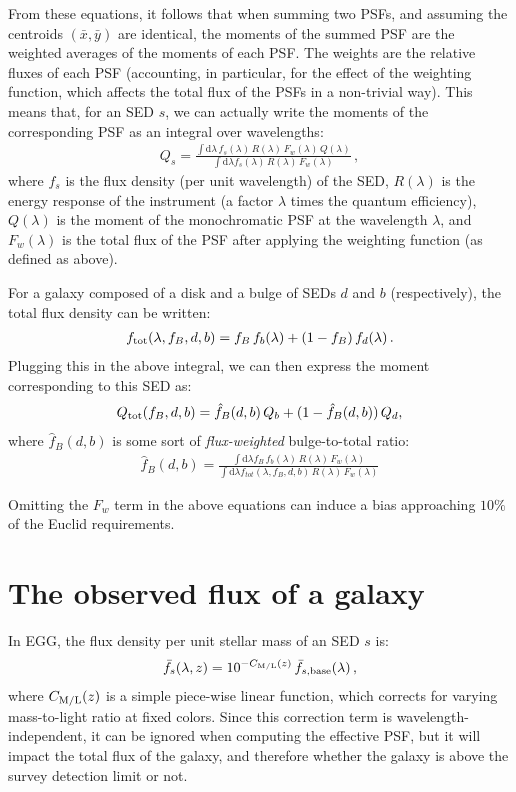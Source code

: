 \documentclass[11pt,a4paper]{article}
\newcommand{\uvj}{\text{\it UVJ}\xspace}
\newcommand{\dd}{\mathrm{d}}
\numberwithin{equation}{section}
\begin{document}
From these equations, it follows that when summing two PSFs, and assuming the centroids $(\bar{x},\bar{y})$ are identical, the moments of the summed PSF are the weighted averages of the moments of each PSF. The weights are the relative fluxes of each PSF (accounting, in particular, for the effect of the weighting function, which affects the total flux of the PSFs in a non-trivial way). This means that, for an SED $s$, we can actually write the moments of the corresponding PSF as an integral over wavelengths:
\begin{align}
Q_s = \frac{\int \dd\lambda\,f_s(\lambda)\,R(\lambda)\,F_w(\lambda)\,Q(\lambda)}{\int \dd\lambda f_s(\lambda)\,R(\lambda)\,F_w(\lambda)}\,,
\end{align}
where $f_s$ is the flux density (per unit wavelength) of the SED, $R(\lambda)$ is the energy response of the instrument (a factor $\lambda$ times the quantum efficiency), $Q(\lambda)$ is the moment of the monochromatic PSF at the wavelength $\lambda$, and $F_w(\lambda)$ is the total flux of the PSF after applying the weighting function (as defined as above).

For a galaxy composed of a disk and a bulge of SEDs $d$ and $b$ (respectively), the total flux density can be written:
\begin{align}
f_{\rm tot}(\lambda, f_B, d, b) = f_B\,f_b(\lambda) + (1-f_B)\,f_d(\lambda)\,.
\end{align}
Plugging this in the above integral, we can then express the moment corresponding to this SED as:
\begin{align}
Q_{\rm tot}(f_B, d, b) = \hat{f}_B(d,b)\,Q_b + (1 - \hat{f}_B(d,b))\,Q_d,
\end{align}
where $\hat{f}_B(d,b)$ is some sort of \emph{flux-weighted} bulge-to-total ratio:
\begin{align}
\hat{f}_B(d,b) = \frac{\int \dd\lambda f_B\,f_b(\lambda)\,R(\lambda)\,F_w(\lambda)}{\int \dd\lambda f_{tot}(\lambda, f_B, d, b)\,R(\lambda)\,F_w(\lambda)}
\end{align}

Omitting the $F_w$ term in the above equations can induce a bias approaching $10\%$ of the Euclid requirements.

\section{The observed flux of a galaxy}

In EGG, the flux density per unit stellar mass of an SED $s$ is:
\begin{align}
\bar{f}_s(\lambda, z) = 10^{-C_{\rm M/L}(z)}\,\bar{f}_{s,{\rm base}}(\lambda)\,,
\end{align}
where $C_{\rm M/L}(z)$ is a simple piece-wise linear function, which corrects for varying mass-to-light ratio at fixed \uvj colors. Since this correction term is wavelength-independent, it can be ignored when computing the effective PSF, but it will impact the total flux of the galaxy, and therefore whether the galaxy is above the survey detection limit or not.
\end{document}
